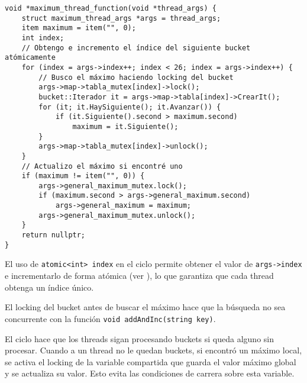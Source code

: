 \begin{verbatim}
void *maximum_thread_function(void *thread_args) {
	struct maximum_thread_args *args = thread_args;
	item maximum = item("", 0);
	int index;
	// Obtengo e incremento el índice del siguiente bucket atómicamente
	for (index = args->index++; index < 26; index = args->index++) {
		// Busco el máximo haciendo locking del bucket
		args->map->tabla_mutex[index]->lock();
		bucket::Iterador it = args->map->tabla[index]->CrearIt();
		for (it; it.HaySiguiente(); it.Avanzar()) {
			if (it.Siguiente().second > maximum.second)
				maximum = it.Siguiente();
		}
		args->map->tabla_mutex[index]->unlock();
	}
	// Actualizo el máximo si encontré uno
	if (maximum != item("", 0)) {
		args->general_maximum_mutex.lock();
		if (maximum.second > args->general_maximum.second)
			args->general_maximum = maximum;
		args->general_maximum_mutex.unlock();
	}
	return nullptr;
}
\end{verbatim}

El uso de \texttt{atomic<int> index} en el ciclo permite obtener el valor de \texttt{args->index} e incrementarlo de forma atómica (ver \cite{cppref-atomic}), lo que garantiza que cada thread obtenga un índice único.

El locking del bucket antes de buscar el máximo hace que la búsqueda no sea concurrente con la función \texttt{void addAndInc(string key)}.

El ciclo hace que los threads sigan procesando buckets si queda alguno sin procesar. Cuando a un thread no le quedan buckets, si encontró un máximo local, se activa el locking de la variable compartida que guarda el valor máximo global y se actualiza su valor. Esto evita las condiciones de carrera sobre esta variable.